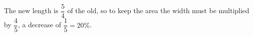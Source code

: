 The new length is $\dfrac{5}{4}$ of the old, so to keep the area the width must be multiplied by $\dfrac{4}{5}$, a decrease of $\dfrac{1}{5}=\boxed{20\%}$.
